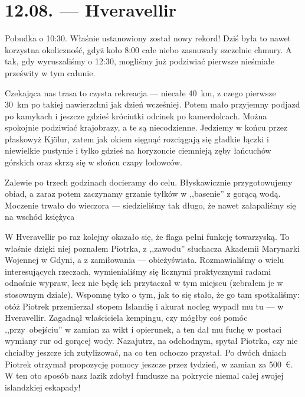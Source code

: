 \chapter*{12.08. --- Hveravellir}

Pobudka o 10:30. Właśnie ustanowiony został nowy rekord! Dziś była to nawet korzystna okoliczność, gdyż koło 8:00 całe niebo zasnuwały szczelnie chmury. A tak, gdy wyruszaliśmy o 12:30, mogliśmy już podziwiać pierwsze nieśmiałe prześwity w tym całunie.

Czekająca nas trasa to czysta rekreacja --- niecałe 40~km, z czego pierwsze 30~km po takiej nawierzchni jak dzień wcześniej. Potem mało przyjemny podjazd po kamykach i jeszcze gdzieś króciutki odcinek po kamerdolcach. Można spokojnie podziwiać krajobrazy, a te są niecodzienne. Jedziemy w końcu przez płaskowyż Kjölur, zatem jak okiem sięgnąć rozciągają się gładkie łączki i niewielkie pustynie i tylko gdzieś na horyzoncie ciemnieją zęby łańcuchów górskich oraz skrzą się w słońcu czapy lodowców.

Zalewie po trzech godzinach docieramy do celu. Błyskawicznie przygotowujemy obiad, a zaraz potem  zaczynamy grzanie tyłków w ,,basenie'' z gorącą wodą. Moczenie trwało do wieczora --- siedzieliśmy tak długo, że nawet załapaliśmy się na wschód księżyca\textellipsis


W Hveravellir po raz kolejny okazało się, że flaga pełni funkcję towarzyską. To właśnie dzięki niej poznałem Piotrka, z ,,zawodu'' słuchacza Akademii Marynarki Wojennej w Gdyni, a z zamiłowania --- obieżyświata. Rozmawialiśmy o wielu interesujących rzeczach, wymienialiśmy się licznymi praktycznymi radami odnośnie wypraw, lecz nie będę ich przytaczał w tym miejscu (zebrałem je w stosownym dziale). Wspomnę tyko o tym, jak to się stało, że go tam spotkaliśmy: otóż Piotrek przemierzał stopem Islandię i akurat nocleg wypadł mu tu --- w Hveravellir. Zagadnął właściciela kempingu, czy mógłby coś pomóc ,,przy~obejściu'' w zamian za wikt i opierunek, a ten dał mu fuchę w postaci wymiany rur od gorącej wody. Nazajutrz, na odchodnym, spytał Piotrka, czy nie chciałby jeszcze ich zutylizować, na co ten ochoczo przystał. Po dwóch dniach Piotrek otrzymał propozycję pomocy jeszcze przez tydzień, w zamian za 500~€. W ten oto sposób nasz łazik zdobył fundusze na pokrycie niemal całej swojej islandzkiej eskapady!


